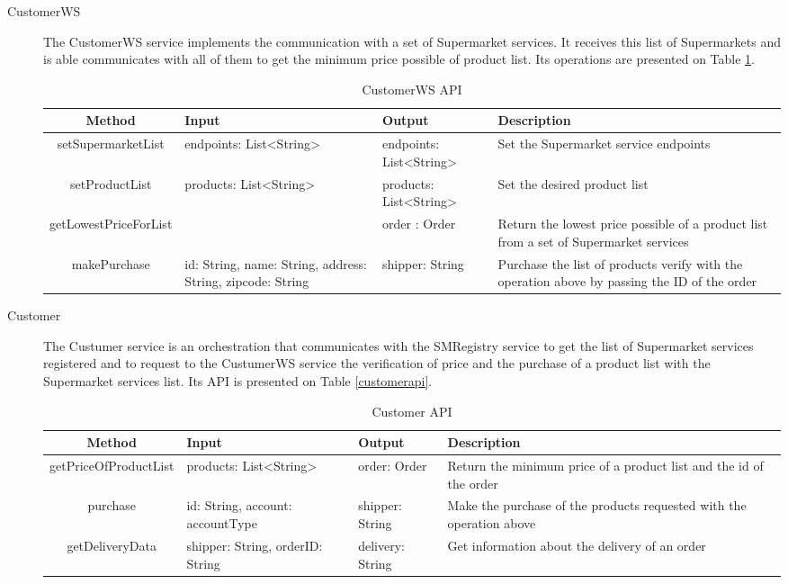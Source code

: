 \begin{description}
\item[CustomerWS] The CustomerWS service implements the communication with a set of Supermarket services. It receives this list of Supermarkets and is able communicates with all of them to get the minimum price possible of product list. Its operations are presented on Table \ref{customerWSapi}.
	\begin{table}[htdp]
	\caption{CustomerWS API}
	\begin{center}
	\begin{tabular}{|c|m{3.5cm}|m{3.5cm}|m{4cm}|}
		\hline
		Method				& Input					& Output 					& Description \\ \hline
		setSupermarketList 		& endpoints: List<String>		& endpoints: List<String>		& Set the Supermarket service endpoints \\ \hline
		setProductList 			& products: List<String>		& products: List<String>		& Set the desired product list \\ \hline
		getLowestPriceForList	&						& order : Order				& Return the lowest price possible of a product list from a set of Supermarket services \\ \hline
		makePurchase & id: String, name: String, address: String, zipcode: String & shipper: String & Purchase the list of products verify with the operation above by passing the ID of the order \\ \hline
		
	\end{tabular}
	\end{center}
	\label{customerWSapi}
	\end{table}%
	
\item[Customer] The Custumer service is an orchestration that communicates with the SMRegistry service to get the list of Supermarket services registered and to request to the CustumerWS service the verification of price and the purchase of a product list with the Supermarket services list. Its API is presented on Table \ref{customerapi}.
	\begin{table}[htdp]
	\caption{Customer API}
	\begin{center}
	\begin{tabular}{|c|m{3.5cm}|m{3.5cm}|m{4cm}|}
		\hline
		Method				& Input					& Output 					& Description \\ \hline
		getPriceOfProductList	& products: List<String> & order: Order & Return the minimum price of a product list and the id of the order\\ \hline
		purchase 				& id: String, account: accountType & shipper: String & Make the purchase of the products requested with the operation above \\ \hline
		getDeliveryData 		& shipper: String, orderID: String & delivery: String & Get information about the delivery of an order \\ \hline
		

\end{tabular}
\end{center}
\end{table}
\end{description}
